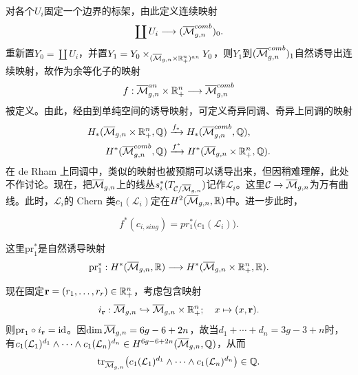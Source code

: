 对各个$U_i$固定一个边界的标架，由此定义连续映射
\[
\coprod U_i\longrightarrow(\overline{\mathcal{M}}^{comb}_{g,n})_0.
\]
重新置$Y_0=\coprod U_i$，并置$Y_1=Y_0\times_{(\overline{\mathcal{M}}_{g,n}\times\mathbb{R}_+^n)^{an}}Y_0$，则$Y_1$到$(\overline{\mathcal{M}}^{comb}_{g,n})_1$自然诱导出连续映射，故作为余等化子的映射
\[
f:\overline{\mathcal{M}}^{an}_{g,n}\times\mathbb{R}_+^n\longrightarrow\overline{\mathcal{M}}^{comb}_{g,n}
\]
被定义。由此，经由到单纯空间的诱导映射，可定义奇异同调、奇异上同调的映射
\[
\begin{aligned}
H_*(\overline{\mathcal{M}}_{g,n}\times\mathbb{R}_+^n,\mathbb{Q})&\xrightarrow{f_*}H_*(\overline{\mathcal{M}}^{comb}_{g,n},\mathbb{Q}),\\
H^*(\overline{\mathcal{M}}^{comb}_{g,n},\mathbb{Q})&\xrightarrow{f^*}H^*(\overline{\mathcal{M}}_{g,n}\times\mathbb{R}_+^n,\mathbb{Q}).
\end{aligned}
\]
在 de Rham 上同调中，类似的映射也被预期可以诱导出来，但因稍难理解，此处不作讨论。现在，把$\overline{\mathcal{M}}_{g,n}$上的线丛$s_i^*(T_{\mathcal{C}/\overline{\mathcal{M}}_{g,n}})$记作$\mathcal{L}_i$。这里$\mathcal{C}\to\overline{\mathcal{M}}_{g,n}$为万有曲线。此时，$\mathcal{L}_i$的 Chern 类$c_1(\mathcal{L}_i)$定在$H^2(\overline{\mathcal{M}}_{g,n},\mathbb{R})$中。进一步此时，

\begin{proposition}
\[
f^*(c_{i,sing})=pr_1^*\bigl(c_1(\mathcal{L}_i)\bigr).
\]
\end{proposition}

这里$\mathrm{pr}_1^*$是自然诱导映射
\[
\mathrm{pr}_1^*:H^*(\overline{\mathcal{M}}_{g,n},\mathbb{R})\longrightarrow H^*(\overline{\mathcal{M}}_{g,n}\times\mathbb{R}_+^n,\mathbb{R}).
\]

现在固定$\mathbf{r}=(r_1,\dots,r_r)\in\mathbb{R}_+^n$，考虑包含映射
\[
i_{\mathbf{r}}:\overline{\mathcal{M}}_{g,n}\hookrightarrow\overline{\mathcal{M}}_{g,n}\times\mathbb{R}_+^n;\quad x\mapsto(x,\mathbf{r}).
\]
则$\mathrm{pr}_1\circ i_{\mathbf{r}}=\mathrm{id}$。因$\dim\overline{\mathcal{M}}_{g,n}=6g-6+2n$，故当$d_1+\cdots+d_n=3g-3+n$时，有$c_1(\mathcal{L}_1)^{d_1}\wedge\cdots\wedge c_1(\mathcal{L}_n)^{d_n}\in H^{6g-6+2n}(\overline{\mathcal{M}}_{g,n},\mathbb{Q})$，从而
\[
\operatorname{tr}_{\overline{\mathcal{M}}_{g,n}}\bigl(c_1(\mathcal{L}_1)^{d_1}\wedge\cdots\wedge c_1(\mathcal{L}_n)^{d_n}\bigr)\in\mathbb{Q} .
\]


